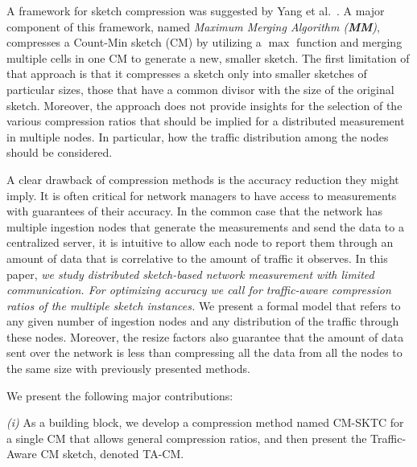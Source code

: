 A framework for sketch compression was suggested by Yang et al.~\cite{yang2018elastic}. A major component of this framework, named \emph{Maximum Merging Algorithm (\textbf{MM})}, compresses a Count-Min sketch (CM) by utilizing a $\max$ function and merging multiple cells in one CM to generate a new, smaller sketch. 
The first limitation of that approach is that it compresses a sketch only into smaller sketches of particular sizes, those that have a common divisor with the size of the original sketch. Moreover, the approach does not provide insights for the selection of the various compression ratios that should be implied for a distributed measurement in multiple nodes. In particular, how the traffic distribution among the nodes should be considered. 
 
A clear drawback of compression methods is the accuracy reduction they might imply. 
It is often critical for network managers to have access to measurements with guarantees of their accuracy.
In the common case that the network has multiple ingestion nodes that generate the measurements and send the data to a centralized server, it is intuitive to allow each node to report them through an amount of data that is correlative to the amount of traffic it observes. In this paper,  \emph{we study distributed sketch-based network measurement with limited communication. For optimizing accuracy  we call for traffic-aware compression ratios of the multiple sketch instances.} We present a formal model that refers to any given number of ingestion nodes and any distribution of the traffic through these nodes. Moreover, the resize factors also guarantee that the amount of data  sent over the network is less than compressing all the data from all the nodes to the same size with previously presented methods.




We present the following major contributions: 

\emph{(i)} As a building block, we develop a compression method named CM-SKTC for a single CM that allows general compression ratios, and then present the Traffic-Aware CM sketch, denoted TA-CM.



